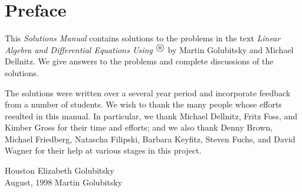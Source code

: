 \large

\section*{Preface}

This {\em Solutions Manual\/} contains solutions to the problems 
in the text {\em Linear Algebra and Differential Equations Using
\Matlabp$^\tm$} by Martin Golubitsky and Michael Dellnitz.  We give 
answers to the problems and complete discussions of the solutions.

\quad The solutions were written over a several year period and incorporate
feedback from a number of students.   We wish to thank the many people whose 
efforts resulted in this manual.  In particular, we thank Michael Dellnitz,  
Fritz Foss, and Kimber Gross for their time and efforts; and we also thank 
Denny Brown, Michael Friedberg, Natascha Filipski, Barbara Keyfitz, Steven 
Fuchs, and David Wagner for their help at various stages in this project.

\vspace{0.2in}

\noindent Houston \hfill Elizabeth Golubitsky \\
August, 1998  \hfill Martin Golubitsky



\normalsize
